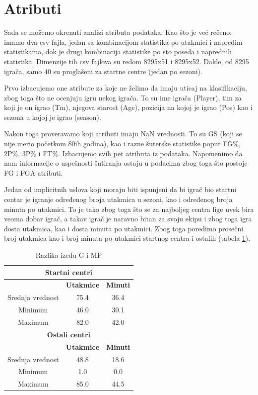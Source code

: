 \documentclass[a4paper]{article}
\begin{document}
\section{Atributi}
\label{sec:atributi}

Sada se možemo okrenuti analizi atributa podataka. Kao što je već rečeno,
imamo dva csv fajla, jedan sa kombinacijom statistika po utakmici i napredim
statistikama, dok je drugi kombinacija statistike po sto poseda i naprednih statistika. Dimenzije tih csv fajlova su redom 8295x51 i 8295x52. Dakle, od 8295
igrača, samo 40 su proglašeni za startne centre (jedan po sezoni).

Prvo izbacujemo one atribute za koje ne želimo da imaju uticaj na klasifikaciju, zbog toga što ne ocenjuju igru nekog igrača. To su ime igrača (Player), tim za koji je on igrao (Tm), njegova starost (Age), pozicija na kojoj je igrao (Pos) kao i sezona u kojoj je igrao (season). 

Nakon toga proveravamo koji atributi imaju NaN vrednosti. To su GS (koji se nije
merio početkom 80ih godina), kao i razne šuterske statistike poput FG\%, 2P\%,
3P\% i FT\%. Izbacujemo svih pet atributa iz podataka. Napomenimo da nam informacije o uspešnosti šutiranja ostaju u podacima zbog toga što postoje FG i FGA atributi.

Jedan od implicitnih uslova koji moraju biti ispunjeni da bi igrač bio startni
centar je igranje određenog broja utakmica u sezoni, kao i određenog broja
minuta po utakmici. To je tako zbog toga što se za najboljeg centra lige uvek
bira veoma dobar igrač, a takav igrač je naravno bitan za svoju ekipu i zbog toga igra dosta utakmica, kao i dosta minuta po utakmici. Zbog toga poredimo prosečni broj utakmica kao i broj minuta po utakmici startnog centra i ostalih (tabela \ref{tab:g_mp}).

\begin{table}[!h]
\begin{center}
\begin{tabular}{|c|c|c|} \hline
\multicolumn{3}{|c|}{\textbf{Startni centri}} \\ \hline
\textbf{} & \textbf{Utakmice} & \textbf{Minuti} \\ \hline
Srednja vrednost & 75.4 & 36.4 \\ \hline
Minimum          & 46.0 & 30.1 \\ \hline
Maximum          & 82.0 & 42.0 \\ \hline
\multicolumn{3}{|c|}{\textbf{Ostali centri}} \\ \hline
\textbf{} & \textbf{Utakmice} & \textbf{Minuti} \\ \hline
Srednja vrednost & 48.8 & 18.6 \\ \hline
Minimum          & 1.0  & 0.0  \\ \hline
Maximum          & 85.0 & 44.5 \\ \hline
\end{tabular}
\caption{Razlika izeđu G i MP}
\label{tab:g_mp}
\end{center}
\end{table}
\end{document}
